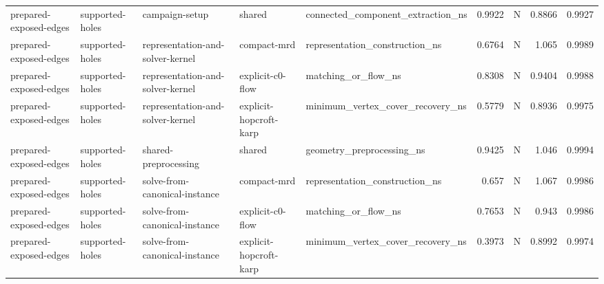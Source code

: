 \begin{table}[t]
\begin{tabular}{lllllrrrr}
prepared-exposed-edges & supported-holes & campaign-setup & shared & connected\_component\_extraction\_ns & 0.9922 & N & 0.8866 & 0.9927 \\
prepared-exposed-edges & supported-holes & representation-and-solver-kernel & compact-mrd & representation\_construction\_ns & 0.6764 & N & 1.065 & 0.9989 \\
prepared-exposed-edges & supported-holes & representation-and-solver-kernel & explicit-c0-flow & matching\_or\_flow\_ns & 0.8308 & N & 0.9404 & 0.9988 \\
prepared-exposed-edges & supported-holes & representation-and-solver-kernel & explicit-hopcroft-karp & minimum\_vertex\_cover\_recovery\_ns & 0.5779 & N & 0.8936 & 0.9975 \\
prepared-exposed-edges & supported-holes & shared-preprocessing & shared & geometry\_preprocessing\_ns & 0.9425 & N & 1.046 & 0.9994 \\
prepared-exposed-edges & supported-holes & solve-from-canonical-instance & compact-mrd & representation\_construction\_ns & 0.657 & N & 1.067 & 0.9986 \\
prepared-exposed-edges & supported-holes & solve-from-canonical-instance & explicit-c0-flow & matching\_or\_flow\_ns & 0.7653 & N & 0.943 & 0.9986 \\
prepared-exposed-edges & supported-holes & solve-from-canonical-instance & explicit-hopcroft-karp & minimum\_vertex\_cover\_recovery\_ns & 0.3973 & N & 0.8992 & 0.9974 \\
\bottomrule
\end{tabular}
\end{table}

